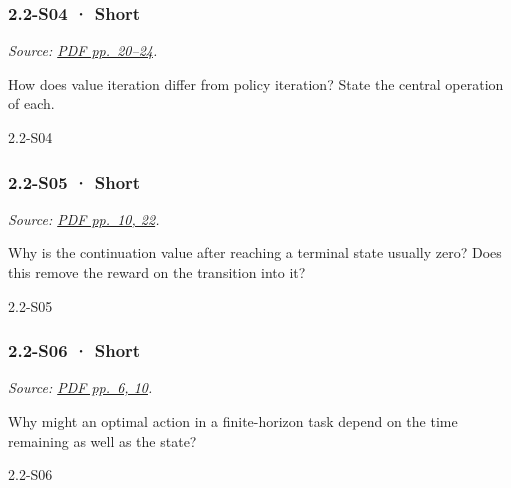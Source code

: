 \noindent\begin{minipage}{\linewidth}

\subsubsection{2.2-S04 · Short}\label{s04-short-4}

\emph{Source:
\href{../Lecture\%20Slides/2.2.\%20Markov\%20decision\%20processes.pdf\#page=20}{PDF
pp.~20--24}.}

How does value iteration differ from policy iteration? State the central
operation of each.

\begin{solution}[20mm]{2.2-S04}

\end{solution}
\end{minipage}\par\medskip

\noindent\begin{minipage}{\linewidth}

\subsubsection{2.2-S05 · Short}\label{s05-short-4}

\emph{Source:
\href{../Lecture\%20Slides/2.2.\%20Markov\%20decision\%20processes.pdf\#page=10}{PDF
pp.~10, 22}.}

Why is the continuation value after reaching a terminal state usually
zero? Does this remove the reward on the transition into it?

\begin{solution}[20mm]{2.2-S05}

\end{solution}
\end{minipage}\par\medskip

\noindent\begin{minipage}{\linewidth}

\subsubsection{2.2-S06 · Short}\label{s06-short-4}

\emph{Source:
\href{../Lecture\%20Slides/2.2.\%20Markov\%20decision\%20processes.pdf\#page=6}{PDF
pp.~6, 10}.}

Why might an optimal action in a finite-horizon task depend on the time
remaining as well as the state?

\begin{solution}[20mm]{2.2-S06}

\end{solution}
\end{minipage}\par\medskip


